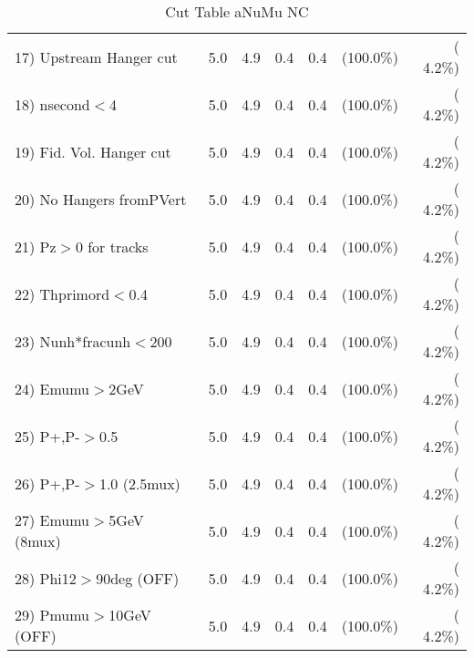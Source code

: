 \begin{table}[h!]
\begin{tabular}{||l||r|r|r|r|r|r||}
 17) Upstream Hanger cut  &          5.0 &          4.9 &          0.4 &          0.4 & (100.0\%) & (  4.2\%) \\
 18) nsecond$<$4          &          5.0 &          4.9 &          0.4 &          0.4 & (100.0\%) & (  4.2\%) \\
 19) Fid. Vol. Hanger cut &          5.0 &          4.9 &          0.4 &          0.4 & (100.0\%) & (  4.2\%) \\
 20) No Hangers fromPVert &          5.0 &          4.9 &          0.4 &          0.4 & (100.0\%) & (  4.2\%) \\
 21) Pz$>$0 for tracks    &          5.0 &          4.9 &          0.4 &          0.4 & (100.0\%) & (  4.2\%) \\
 22) Thprimord$<$0.4      &          5.0 &          4.9 &          0.4 &          0.4 & (100.0\%) & (  4.2\%) \\
 23) Nunh*fracunh$<$200   &          5.0 &          4.9 &          0.4 &          0.4 & (100.0\%) & (  4.2\%) \\
 24) Emumu$>$2GeV         &          5.0 &          4.9 &          0.4 &          0.4 & (100.0\%) & (  4.2\%) \\
 25) P+,P-$>$0.5          &          5.0 &          4.9 &          0.4 &          0.4 & (100.0\%) & (  4.2\%) \\
 26) P+,P-$>$1.0 (2.5mux) &          5.0 &          4.9 &          0.4 &          0.4 & (100.0\%) & (  4.2\%) \\
 27) Emumu$>$5GeV  (8mux) &          5.0 &          4.9 &          0.4 &          0.4 & (100.0\%) & (  4.2\%) \\
 28) Phi12$>$90deg  (OFF) &          5.0 &          4.9 &          0.4 &          0.4 & (100.0\%) & (  4.2\%) \\
 29) Pmumu$>$10GeV  (OFF) &          5.0 &          4.9 &          0.4 &          0.4 & (100.0\%) & (  4.2\%) \\
 \hline
 \hline
 \end{tabular}
 \caption{Cut Table  aNuMu NC }
 \label{tab-cutcohjpsi-mumu_anumunc}
 \end{table}
